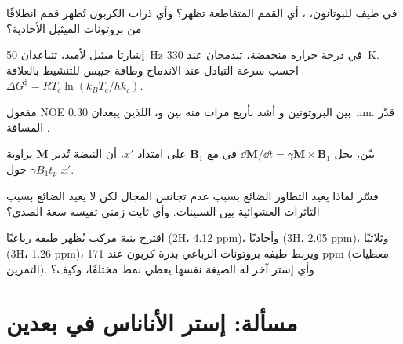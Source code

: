 \begin{exercise}[$\star\star$]\label{exo:b3:advanced-nmr:7}
في طيف  للبوتانون، ، أي القمم المتقاطعة تظهر؟
وأي ذرات الكربون تُظهر قمم  انطلاقًا من بروتونات الميثيل الأحادية؟
\end{exercise}

\begin{exercise}[$\star\star$]\label{exo:b3:advanced-nmr:8}
إشارتا ميثيل لأميد، تتباعدان \qty{50}{Hz} في درجة حرارة منخفضة، تندمجان عند
\qty{330}{K}. احسب سرعة التبادل عند الاندماج وطاقة جيبس
للتنشيط بالعلاقة $\Delta G^\ddagger = RT_c\ln(k_BT_c/hk_c)$.
\end{exercise}

\begin{exercise}[$\star\star$]\label{exo:b3:advanced-nmr:9}
مفعول NOE بين البروتونين  و أشد بأربع مرات منه بين  
و، اللذين يبعدان \qty{0.30}{nm}. قدّر المسافة .
\end{exercise}

\begin{exercise}[$\star\star\star$]\label{exo:b3:advanced-nmr:10}
بيّن، بحل $\dd\mathbf M/\dd t = \gamma\mathbf M\times\mathbf B_1$ في 
مع $\mathbf B_1$ على امتداد $x'$، أن النبضة تُدير $\mathbf M$ بزاوية $\gamma B_1t_p$ حول $x'$.
\end{exercise}

\begin{exercise}[$\star\star\star$]\label{exo:b3:advanced-nmr:11}
فسّر لماذا يعيد  التطاور الضائع بسبب عدم تجانس
المجال لكن لا يعيد الضائع بسبب التآثرات العشوائية بين السبينات. وأي ثابت
زمني تقيسه سعة الصدى؟
\end{exercise}

\begin{exercise}[$\star\star\star$]\label{exo:b3:advanced-nmr:12}
اقترح بنية مركب  يُظهر طيفه 
رباعيًا (2H، 4.12 ppm)، وأحاديًا (3H، 2.05 ppm)، وثلاثيًا (3H،
1.26 ppm)، ويربط طيفه  بروتونات الرباعي بذرة
كربون عند 171 ppm (معطيات التمرين). وأي إستر آخر له الصيغة
نفسها يعطي نمط  مختلفًا، وكيف؟
\end{exercise}

\section{مسألة: إستر الأناناس في بعدين}

